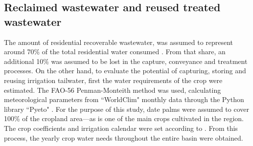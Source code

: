  



\subsection{Reclaimed wastewater and reused treated wastewater}
The amount of residential recoverable wastewater, was assumed to represent around 70\% of the total residential water consumed \cite{unescoWastewaterUntappedResource2017}. From that share, an additional 10\% was assumed to be lost in the capture, conveyance and treatment processes.
On the other hand, to evaluate the potential of capturing, storing and reusing irrigation tailwater, first the water requirements of the crop were estimated. The FAO-56 Penman-Monteith method \cite{allenFAOIrrigationDrainage1998} was used, calculating meteorological parameters from ``WorldClim" monthly data \cite{WorldClimGlobalClimate} through the Python library ``Pyeto" \cite{pyeto}. For the purpose of this study, date palms were assumed to cover 100\% of the cropland area---as is one of the main crops cultivated in the region. The crop coefficients and irrigation calendar were set according to \citet{almullaNWSAS}. From this process, the yearly crop water needs throughout the entire basin were obtained.

